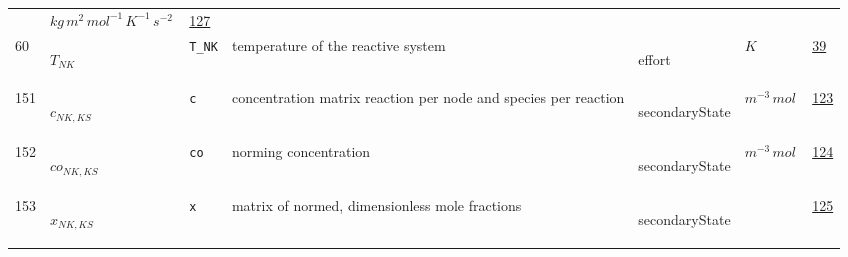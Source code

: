 \begin{longtable}{|p{1cm}|p{2.5cm}|p{4.5cm}|p{8cm}|p{3.0cm}|p{3cm}|p{1cm}|}
             & $ kg \,m^{2} \,mol^{-1} \,K^{-1} \,s^{-2} \, $
             & \hyperlink{"e:127"}{ 127 }
                 \\
    60
             & \hypertarget{"v:60"}{ $ {T}{_{{N K}}} $}
             & \verb|T_NK|
             & temperature of the reactive system
             & \begin{lay}effort \end{lay}
             & $ K \, $
             & \hyperlink{"e:39"}{ 39 }
                 \\
    151
             & \hypertarget{"v:151"}{ $ {c}{_{{N K}, {K S}}} $}
             & \verb|c|
             & concentration matrix reaction per node and species per reaction
             & \begin{lay}secondaryState \end{lay}
             & $ m^{-3} \,mol \, $
             & \hyperlink{"e:123"}{ 123 }
                 \\
    152
             & \hypertarget{"v:152"}{ $ {co}{_{{N K}, {K S}}} $}
             & \verb|co|
             & norming concentration
             & \begin{lay}secondaryState \end{lay}
             & $ m^{-3} \,mol \, $
             & \hyperlink{"e:124"}{ 124 }
                 \\
    153
             & \hypertarget{"v:153"}{ $ {x}{_{{N K}, {K S}}} $}
             & \verb|x|
             & matrix of normed, dimensionless mole fractions 
             & \begin{lay}secondaryState \end{lay}
             & $  $
             & \hyperlink{"e:125"}{ 125 }
                 \\
    \end{longtable}